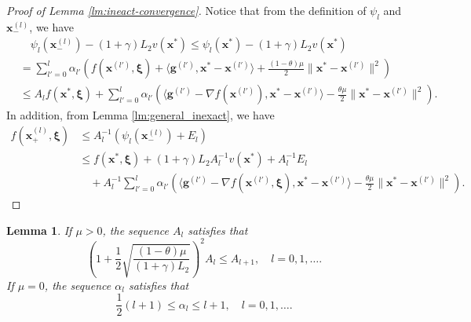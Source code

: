 \documentclass[11pt,fullpage,letterpaper]{article}
\newcommand{\mb}{\mathbf}
\newcommand{\bx}{\boldsymbol{\xi}}
\newtheorem{lemma}{Lemma}[section]
\begin{document}
\begin{proof}[Proof of Lemma \ref{lm:ineact-convergence}]
Notice that from the definition of $\psi_l$ and $\mb x_-^{(l)}$, we have
\begin{align*}
    &\quad \psi_l(\mb x_-^{(l)})-(1+\gamma)L_2v(\mb x^*)  \leq \psi_l(\mb x^*)-(1+\gamma)L_2v(\mb x^*)\\
    & =  \sum_{l'=0}^l \alpha_{l'}(f(\mb x^{(l')},\bx) +\langle \mb g^{(l')},\mb x^*-\mb x^{(l')}\rangle + \frac{(1-\theta)\mu}{2}\|\mb x^* - \mb x^{(l')}\|^2)\\
    &\leq A_lf(\mb x^*,\bx) + \sum_{l'=0}^l \alpha_{l'}(\langle \mb g^{(l')}-\nabla f(\mb x^{(l')}),\mb x^*-\mb x^{(l')}\rangle-\frac{\theta \mu}{2}\|\mb x^* - \mb x^{(l')}\|^2).
\end{align*}
In addition, from Lemma \ref{lm:general_inexact}, we have
\begin{align*}
    f(\mb x_+^{(l)},\bx)&\leq A_l^{-1}(\psi_l(\mb x_-^{(l)}) + E_l)\\
    & \leq f(\mb x^*,\bx) + (1+\gamma)L_2A_l^{-1}v(\mb x^*) +  A_l^{-1}E_l
     \\
     &\quad + A_l^{-1}\sum_{l'=0}^l \alpha_{l'}(\langle \mb g^{(l')}-\nabla f(\mb x^{(l')},\bx),\mb x^*-\mb x^{(l')}\rangle-\frac{\theta \mu}{2}\|\mb x^* - \mb x^{(l')}\|^2) .
\end{align*}
\end{proof}

\begin{lemma}\label{lm:para-seq}
If $\mu>0$, the sequence $A_l$ satisfies that 
    \begin{displaymath}
        (1+\frac{1}{2}\sqrt{\frac{(1-\theta)\mu}{(1+\gamma)L_2}})^2A_l\leq A_{l+1},\quad l=0,1,\ldots.
    \end{displaymath}
If $\mu =0$, the sequence $\alpha_l$ satisfies that 
\begin{displaymath}
    \frac{1}{2}(l+1)\leq \alpha_l \leq l+1,\quad l=0,1,\ldots.
\end{displaymath}
\end{lemma}
\end{document}
